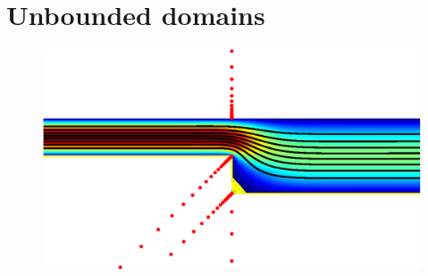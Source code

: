 \section{Unbounded domains \label{sec:unbounded}}


\begin{figure}[H]
	\centering
	\includegraphics[width=\linewidth]{Figures/chan}
	

\end{figure}
